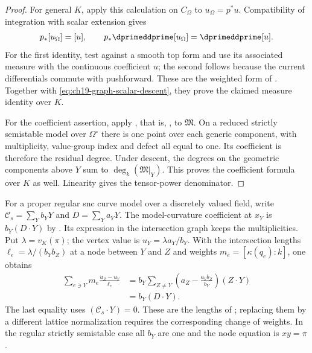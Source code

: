 \begin{proof}
For general $K$, apply this calculation on $C_\Omega$ to
$u_\Omega=p^*u$.  Compatibility of integration with scalar
extension gives
\[
                   p_*[u_\Omega]=[u],\qquad
                   p_*\dprimeddprime[u_\Omega]=\dprimeddprime[u].
\]
For the first identity, test against a smooth top form and use its
associated measure with the continuous coefficient $u$; the second
follows because the current differentials commute with pushforward.
These are the weighted form of
\cite[Propositions~15.3.1 and 16.1.1]{CLD25}.
Together with \eqref{eq:ch19-graph-scalar-descent}, they prove the
claimed measure identity over $K$.

For the coefficient assertion, apply
, that is,
\cite[Theorem~18.5.5]{CLD25}, to $\mathfrak M$.
On a reduced strictly semistable model over $\Omega^\circ$ there
is one point over each generic component, with multiplicity,
value-group index and defect all equal to one.  Its coefficient is
therefore the residual degree.  Under descent, the degrees on the
geometric components above $Y$ sum to $\deg_k(\mathfrak M|_Y)$.
This proves the coefficient formula over $K$ as well.
Linearity gives the tensor-power denominator.
\end{proof}

\begin{remark}
\label{rem:ch19-nonreduced-model-lengths}
For a proper regular snc curve model over a discretely valued field,
write $\mathcal C_s=\sum_Yb_YY$ and $D=\sum_Ya_YY$.
The model-curvature coefficient at $x_Y$ is
$b_Y(D\cdot Y)$ by .
Its expression in the intersection graph keeps the multiplicities.
Put $\lambda=v_K(\pi)$; the vertex value is
$u_Y=\lambda a_Y/b_Y$.  With the intersection lengths
$\ell_e=\lambda/(b_Yb_Z)$ at a node between $Y$ and $Z$ and
weights $m_e=[\kappa(q_e):k]$, one obtains
\[
\begin{aligned}
 \sum_{e\ni Y}m_e\frac{u_Z-u_Y}{\ell_e}
   &=b_Y\sum_{Z\ne Y}
         \left(a_Z-\frac{a_Yb_Z}{b_Y}\right)(Z\cdot Y)\\
   &=b_Y(D\cdot Y).
\end{aligned}
\]
The last equality uses $(\mathcal C_s\cdot Y)=0$.
These are the lengths of ; replacing them
by a different lattice normalization requires the corresponding
change of weights.  In the regular strictly semistable case all
$b_Y$ are one and the node equation is $xy=\pi$.
\end{remark}

